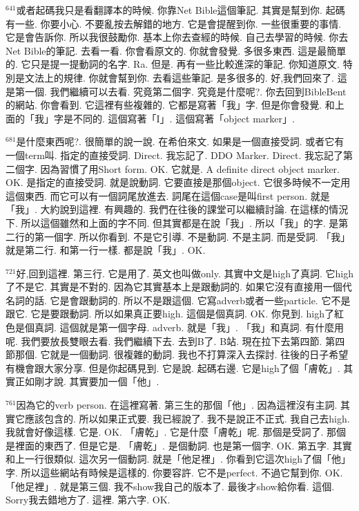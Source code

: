 \documentclass{book}
\begin{document}
$^{641}$或者起碼我只是看翻譯本的時候.
你靠Net Bible這個筆記.
其實是幫到你.
起碼有一些.
你要小心.
不要亂按去解錯的地方.
它是會提醒到你.
一些很重要的事情.
它是會告訴你.
所以我很鼓勵你.
基本上你去查經的時候.
自己去學習的時候.
你去Net Bible的筆記.
去看一看.
你會看原文的.
你就會發覺.
多很多東西.
這是最簡單的.
它只是提一提動詞的名字.
Ra.
但是.
再有一些比較進深的筆記.
你知道原文.
特別是文法上的規律.
你就會幫到你.
去看這些筆記.
是多很多的.
好,我們回來了.
這是第一個.
我們繼續可以去看.
究竟第二個字.
究竟是什麼呢?.
你去回到BibleBent的網站.
你會看到.
它這裡有些複雜的.
它都是寫著「我」字.
但是你會發覺.
和上面的「我」字是不同的.
這個寫著「I」.
這個寫著「object marker」.

$^{681}$是什麼東西呢?.
很簡單的說一說.
在希伯來文.
如果是一個直接受詞.
或者它有一個term叫.
指定的直接受詞.
Direct.
我忘記了.
DDO Marker.
Direct.
我忘記了第二個字.
因為習慣了用Short form.
OK.
它就是.
A definite direct object marker.
OK.
是指定的直接受詞.
就是說動詞.
它要直接是那個object.
它很多時候不一定用這個東西.
而它可以有一個詞尾放進去.
詞尾在這個case是叫first person.
就是「我」.
大約說到這裡.
有興趣的.
我們在往後的課堂可以繼續討論.
在這樣的情況下.
所以這個雖然和上面的字不同.
但其實都是在說「我」.
所以「我」的字.
是第二行的第一個字.
所以你看到.
不是它引導.
不是動詞.
不是主詞.
而是受詞.
「我」就是第二行.
和第一行一樣.
都是說「我」.
OK.

$^{721}$好,回到這裡.
第三行.
它是用了.
英文也叫做only.
其實中文是high了真詞.
它high了不是它.
其實是不對的.
因為它其實基本上是跟動詞的.
如果它沒有直接用一個代名詞的話.
它是會跟動詞的.
所以不是跟這個.
它寫adverb或者一些particle.
它不是跟它.
它是要跟動詞.
所以如果真正要high.
這個是個真詞.
OK.
你見到.
high了紅色是個真詞.
這個就是第一個字母.
adverb.
就是「我」.
「我」和真詞.
有什麼用呢.
我們要放長雙眼去看.
我們繼續下去.
去到B了.
B站.
現在拉下去第四節.
第四節那個.
它就是一個動詞.
很複雜的動詞.
我也不打算深入去探討.
往後的日子希望有機會跟大家分享.
但是你起碼見到.
它是說.
起碼右邊.
它是high了個「膚乾」.
其實正如剛才說.
其實要加一個「他」.

$^{761}$因為它的verb person.
在這裡寫著.
第三生的那個「他」.
因為這裡沒有主詞.
其實它應該包含的.
所以如果正式要.
我已經說了.
我不是說正不正式.
我自己去high.
我就會好像這樣.
它是.
OK.
「膚乾」.
它是什麼「膚乾」呢.
那個是受詞了.
那個是裡面的東西了.
但是它是.
「膚乾」.
是個動詞.
也是第一個字.
OK.
第五字.
其實和上一行很類似.
這次另一個動詞.
就是「他足裡」.
你看到它這次high了個「他」字.
所以這些網站有時候是這樣的.
你要容許.
它不是perfect.
不過它幫到你.
OK.
「他足裡」.
就是第三個.
我不show我自己的版本了.
最後才show給你看.
這個.
Sorry我去錯地方了.
這裡.
第六字.
OK.
\end{document}
